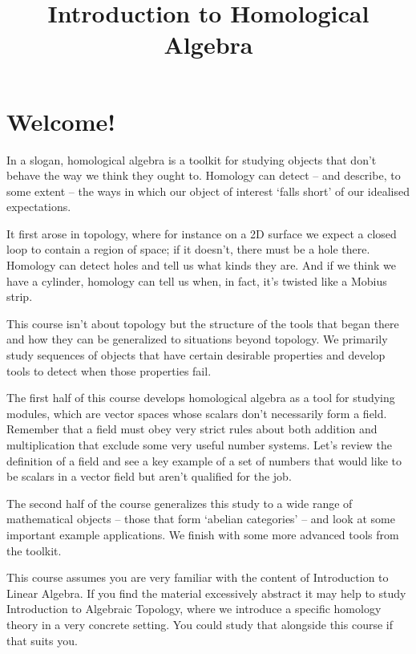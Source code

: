 \documentclass[oneside,english]{amsbook}
\numberwithin{section}{chapter}
\theoremstyle{plain}
\theoremstyle{definition}
\begin{document}
	
	\title{Introduction to Homological Algebra}
	
	\maketitle
	
	\tableofcontents
	
	\chapter*{Welcome!}
	
		In a slogan, homological algebra is a toolkit for studying objects that don't behave the way we think they ought to. Homology can detect -- and describe, to some extent -- the ways in which our object of interest `falls short' of our idealised expectations. 
		
		It first arose in topology, where for instance on a 2D surface we expect a closed loop to contain a region of space; if it doesn't, there must be a hole there. Homology can detect holes and tell us what kinds they are. And if we think we have a cylinder, homology can tell us when, in fact, it's twisted like a M\:obius strip. 
		
		This course isn't about topology but the structure of the tools that began there and how they can be generalized to situations beyond topology. We primarily study sequences of objects that have certain desirable properties and develop tools to detect when those properties fail.

		The first half of this course develops homological algebra as a tool for studying modules, which are vector spaces whose scalars don't necessarily form a field. Remember that a field must obey very strict rules about both addition and multiplication that exclude some very useful number systems. Let's review the definition of a field and see a key example of a set of numbers that would like to be scalars in a vector field but aren't qualified for the job.

		The second half of the course generalizes this study to a wide range of mathematical objects -- those that form `abelian categories' -- and look at some important example applications. We finish with some more advanced tools from the toolkit.
		
		This course assumes you are very familiar with the content of Introduction to Linear Algebra. If you find the material excessively abstract it may help to study Introduction to Algebraic Topology, where we introduce a specific homology theory in a very concrete setting. You could study that alongside this course if that suits you.
	
\end{document}
